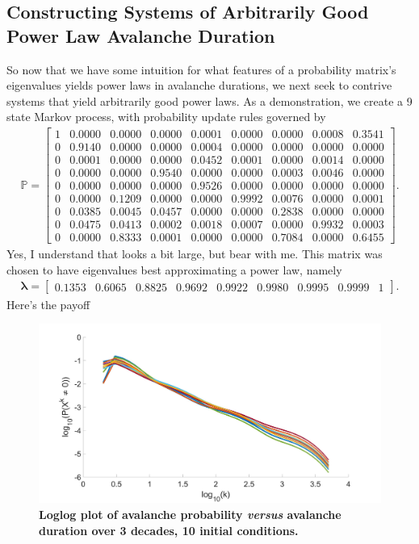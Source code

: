 \documentclass[superscriptaddress]{revtex4-1}
\newcommand{\prob}{\mathbb{P}}
\begin{document}
\subsection{Constructing Systems of Arbitrarily Good Power Law Avalanche Duration}
So now that we have some intuition for what features of a probability matrix's eigenvalues yields power laws in avalanche durations, we next seek to contrive systems that yield arbitrarily good power laws. As a demonstration, we create a 9 state Markov process, with probability update rules governed by
\begin{align*}
\prob = 
\begin{bmatrix}
1 & 0.0000 & 0.0000 & 0.0000 & 0.0001 & 0.0000 & 0.0000 & 0.0008 & 0.3541\\
0 & 0.9140 & 0.0000 & 0.0000 & 0.0004 & 0.0000 & 0.0000 & 0.0000 & 0.0000\\
0 & 0.0001 & 0.0000 & 0.0000 & 0.0452 & 0.0001 & 0.0000 & 0.0014 & 0.0000\\
0 & 0.0000 & 0.0000 & 0.9540 & 0.0000 & 0.0000 & 0.0003 & 0.0046 & 0.0000\\
0 & 0.0000 & 0.0000 & 0.0000 & 0.9526 & 0.0000 & 0.0000 & 0.0000 & 0.0000\\
0 & 0.0000 & 0.1209 & 0.0000 & 0.0000 & 0.9992 & 0.0076 & 0.0000 & 0.0001\\
0 & 0.0385 & 0.0045 & 0.0457 & 0.0000 & 0.0000 & 0.2838 & 0.0000 & 0.0000\\
0 & 0.0475 & 0.0413 & 0.0002 & 0.0018 & 0.0007 & 0.0000 & 0.9932 & 0.0003\\
0 & 0.0000 & 0.8333 & 0.0001 & 0.0000 & 0.0000 & 0.7084 & 0.0000 & 0.6455
\end{bmatrix}.
\end{align*}
Yes, I understand that looks a bit large, but bear with me. This matrix was chosen to have eigenvalues best approximating a power law, namely
\begin{align*}
\bm{\lambda} = 
\begin{bmatrix}
0.1353 & 0.6065 & 0.8825 & 0.9692 & 0.9922 & 0.9980 & 0.9995 & 0.9999 & 1
\end{bmatrix}.
\end{align*}
Here's the payoff
\begin{figure}[h!]
	\centering
	\includegraphics[width=0.5\columnwidth]{power_prob_con_1.jpg}
	\caption{\textbf{Loglog plot of avalanche probability \emph{versus} avalanche duration over 3 decades, 10 initial conditions.}}
\end{figure}
\end{document}
